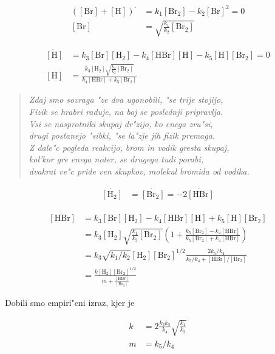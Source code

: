 \documentclass[a4paper,10pt]{article}
\newcommand{\HH}{\ensuremath{[\mathrm{H_2}]}}
\newcommand{\BBr}{\ensuremath{[\mathrm{Br_2}]}}
\newcommand{\HBr}{\ensuremath{[\mathrm{HBr}]}}
\begin{document}
\begin{align}
 ([\mathrm{Br}] + [\mathrm{H}])^\cdot &= k_1 [\mathrm{Br_2}] - k_2 [\mathrm{Br}]^2  = 0 \\
 [\mathrm{Br}] &= \sqrt{\frac{k_1}{k_2}\BBr}
\end{align}

\begin{align}
  \dot{[\mathrm{H}]} &= k_3 [\mathrm{Br}] [\mathrm{H_2}] - k_4 [\mathrm{HBr}] [\mathrm{H}] - k_5 [\mathrm{H}] [\mathrm{Br_2}] = 0\\
  [\mathrm{H}] &= \frac{k_3 \HH \sqrt{\frac{k_1}{k_2}\BBr} }{k_4 \HBr + k_5 \BBr}
\end{align}

\begin{verse}
 \textit{Zdaj smo sovraga "ze dva ugonobili, "se trije stojijo, \\
Fizik se hrabri raduje, na boj se poslednji pripravlja. \\
Vsi se nasprotniki skupaj dr"zijo, ko enega zru"si, \\
drugi postanejo "sibki, "se la"zje jih fizik premaga. \\
Z dale"c pogleda reakcijo, brom in vodik gresta skupaj, \\
kol'kor gre enega noter, se drugega tudi porabi, \\
dvakrat ve"c pride ven skupkov, molekul bromida od vodika. 
}
\end{verse}

\begin{align}
 \dot{[\mathrm{H_2}]} &= \dot{[\mathrm{Br_2}]} = -2\dot{[\mathrm{HBr}]}
\end{align}


\begin{align}
 \dot{[\mathrm{HBr}]} &= k_3 [\mathrm{Br}] [\mathrm{H_2}] - k_4 [\mathrm{HBr}] [\mathrm{H}] + k_5 [\mathrm{H}] [\mathrm{Br_2}] \\
  &= k_3 \HH \sqrt{\frac{k_1}{k_2}\BBr} \left( 1 + \frac{k_5\BBr - k_4 \HBr}{k_5\BBr + k_4 \HBr} \right) \\
  &= k_3 \sqrt{k_1/k_2} \HH\BBr^{1/2} \frac{2k_5/k_4}{k_5/k_4  + \HBr/\BBr} \\
  &= \frac{k\HH\BBr^{1/2}}{m + \frac{\HBr}{\BBr}}
\end{align}

Dobili smo empiri"cni izraz, kjer je 

\begin{align}
 k &= 2\frac{k_3k_5}{k_4}\sqrt{\frac{k_1}{k_2}} \\
 m &= k_5/k_4
\end{align}
\end{document}
